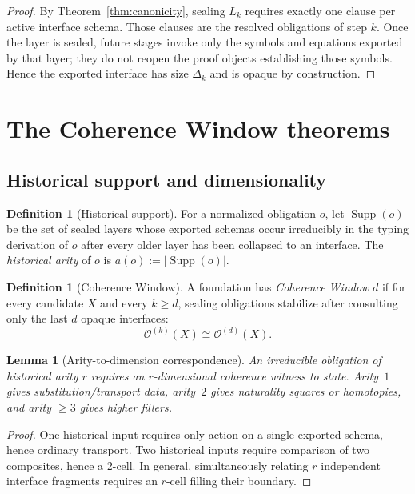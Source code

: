 \documentclass{lmcs}
\theoremstyle{plain}
\newtheorem{lem}[thm]{Lemma}
\theoremstyle{definition}
\newtheorem{defi}[thm]{Definition}
\theoremstyle{remark}
\newcommand{\Ob}{\ensuremath{\mathcal{O}}}
\newcommand{\Supp}{\ensuremath{\operatorname{Supp}}}
\begin{document}
\begin{proof}
By Theorem~\ref{thm:canonicity}, sealing $L_k$ requires exactly one clause per active interface schema.
Those clauses are the resolved obligations of step $k$.
Once the layer is sealed, future stages invoke only the symbols and equations exported by that layer; they do not reopen the proof objects establishing those symbols.
Hence the exported interface has size $\Delta_k$ and is opaque by construction.
\end{proof}

\section{The Coherence Window theorems}
\label{sec:window}

\subsection{Historical support and dimensionality}

\begin{defi}[Historical support]
For a normalized obligation $o$, let $\Supp(o)$ be the set of sealed layers whose exported schemas occur irreducibly in the typing derivation of $o$ after every older layer has been collapsed to an interface.
The \emph{historical arity} of $o$ is $a(o):=|\Supp(o)|$.
\end{defi}

\begin{defi}[Coherence Window]
A foundation has \emph{Coherence Window} $d$ if for every candidate $X$ and every $k\geq d$, sealing obligations stabilize after consulting only the last $d$ opaque interfaces:
\[
  \Ob^{(k)}(X) \cong \Ob^{(d)}(X).
\]
\end{defi}

\begin{lem}[Arity-to-dimension correspondence]
\label{lem:arity}
An irreducible obligation of historical arity $r$ requires an $r$-dimensional coherence witness to state.
Arity~$1$ gives substitution/transport data, arity~$2$ gives naturality squares or homotopies, and arity $\geq 3$ gives higher fillers.
\end{lem}

\begin{proof}
One historical input requires only action on a single exported schema, hence ordinary transport.
Two historical inputs require comparison of two composites, hence a 2-cell.
In general, simultaneously relating $r$ independent interface fragments requires an $r$-cell filling their boundary.
\end{proof}
\end{document}
